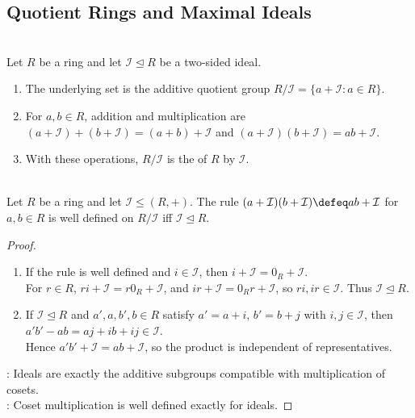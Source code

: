 \subsection{Quotient Rings and Maximal Ideals}

\begin{definition} \label{def:quotient-ring} \\
Let $R$ be a ring and let $\mathcal{I}\trianglelefteq R$ be a two-sided ideal.
\begin{enumerate}[label=(\roman*)]
\setlength{\itemsep}{0pt}
\item The underlying set is the additive quotient group $R/\mathcal{I}=\{a+\mathcal{I}:a\in R\}$.
\item For $a,b\in R$, addition and multiplication are $(a+\mathcal{I})+(b+\mathcal{I})=(a+b)+\mathcal{I}$ and $(a+\mathcal{I})(b+\mathcal{I})=ab+\mathcal{I}$.
\item With these operations, $R/\mathcal{I}$ is the  of $R$ by $\mathcal{I}$.
\end{enumerate}
\end{definition}

\begin{proposition} \label{prop:quotient-ring-well-defined-by-ideal} \\
Let $R$ be a ring and let $\mathcal{I}\leq (R,+)$. The rule $(a+\mathcal{I})(b+\mathcal{I})\defeq ab+\mathcal{I}$ for $a,b\in R$ is well defined on $R/\mathcal{I}$ iff $\mathcal{I}\trianglelefteq R$.
\begin{proof}
\begin{enumerate}[label=\roman*.]
\setlength{\itemsep}{0pt}
\item[$(\Rightarrow)$] If the rule is well defined and $i\in\mathcal{I}$, then $i+\mathcal{I}=0_R+\mathcal{I}$.\\
For $r\in R$, $ri+\mathcal{I}=r0_R+\mathcal{I}$, and $ir+\mathcal{I}=0_Rr+\mathcal{I}$, so $ri,ir\in\mathcal{I}$. Thus $\mathcal{I}\trianglelefteq R$.
\item[$(\Leftarrow)$] If $\mathcal{I}\trianglelefteq R$ and $a',a,b',b\in R$ satisfy $a'=a+i$, $b'=b+j$ with $i,j\in\mathcal{I}$, then $a'b'-ab=aj+ib+ij\in\mathcal{I}$.\\
Hence $a'b'+\mathcal{I}=ab+\mathcal{I}$, so the product is independent of representatives.
\end{enumerate}
: Ideals are exactly the additive subgroups compatible with multiplication of cosets.\\
: Coset multiplication is well defined exactly for ideals.
\end{proof}
\end{proposition}

